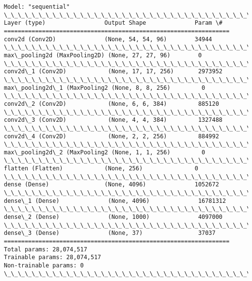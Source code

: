 \documentclass[11pt]{article}
\begin{document}
    \begin{Verbatim}[commandchars=\\\{\}]
Model: "sequential"
\_\_\_\_\_\_\_\_\_\_\_\_\_\_\_\_\_\_\_\_\_\_\_\_\_\_\_\_\_\_\_\_\_\_\_\_\_\_\_\_\_\_\_\_\_\_\_\_\_\_\_\_\_\_\_\_\_\_\_\_\_\_\_\_\_
Layer (type)                 Output Shape              Param \#
=================================================================
conv2d (Conv2D)              (None, 54, 54, 96)        34944
\_\_\_\_\_\_\_\_\_\_\_\_\_\_\_\_\_\_\_\_\_\_\_\_\_\_\_\_\_\_\_\_\_\_\_\_\_\_\_\_\_\_\_\_\_\_\_\_\_\_\_\_\_\_\_\_\_\_\_\_\_\_\_\_\_
max\_pooling2d (MaxPooling2D) (None, 27, 27, 96)        0
\_\_\_\_\_\_\_\_\_\_\_\_\_\_\_\_\_\_\_\_\_\_\_\_\_\_\_\_\_\_\_\_\_\_\_\_\_\_\_\_\_\_\_\_\_\_\_\_\_\_\_\_\_\_\_\_\_\_\_\_\_\_\_\_\_
conv2d\_1 (Conv2D)            (None, 17, 17, 256)       2973952
\_\_\_\_\_\_\_\_\_\_\_\_\_\_\_\_\_\_\_\_\_\_\_\_\_\_\_\_\_\_\_\_\_\_\_\_\_\_\_\_\_\_\_\_\_\_\_\_\_\_\_\_\_\_\_\_\_\_\_\_\_\_\_\_\_
max\_pooling2d\_1 (MaxPooling2 (None, 8, 8, 256)         0
\_\_\_\_\_\_\_\_\_\_\_\_\_\_\_\_\_\_\_\_\_\_\_\_\_\_\_\_\_\_\_\_\_\_\_\_\_\_\_\_\_\_\_\_\_\_\_\_\_\_\_\_\_\_\_\_\_\_\_\_\_\_\_\_\_
conv2d\_2 (Conv2D)            (None, 6, 6, 384)         885120
\_\_\_\_\_\_\_\_\_\_\_\_\_\_\_\_\_\_\_\_\_\_\_\_\_\_\_\_\_\_\_\_\_\_\_\_\_\_\_\_\_\_\_\_\_\_\_\_\_\_\_\_\_\_\_\_\_\_\_\_\_\_\_\_\_
conv2d\_3 (Conv2D)            (None, 4, 4, 384)         1327488
\_\_\_\_\_\_\_\_\_\_\_\_\_\_\_\_\_\_\_\_\_\_\_\_\_\_\_\_\_\_\_\_\_\_\_\_\_\_\_\_\_\_\_\_\_\_\_\_\_\_\_\_\_\_\_\_\_\_\_\_\_\_\_\_\_
conv2d\_4 (Conv2D)            (None, 2, 2, 256)         884992
\_\_\_\_\_\_\_\_\_\_\_\_\_\_\_\_\_\_\_\_\_\_\_\_\_\_\_\_\_\_\_\_\_\_\_\_\_\_\_\_\_\_\_\_\_\_\_\_\_\_\_\_\_\_\_\_\_\_\_\_\_\_\_\_\_
max\_pooling2d\_2 (MaxPooling2 (None, 1, 1, 256)         0
\_\_\_\_\_\_\_\_\_\_\_\_\_\_\_\_\_\_\_\_\_\_\_\_\_\_\_\_\_\_\_\_\_\_\_\_\_\_\_\_\_\_\_\_\_\_\_\_\_\_\_\_\_\_\_\_\_\_\_\_\_\_\_\_\_
flatten (Flatten)            (None, 256)               0
\_\_\_\_\_\_\_\_\_\_\_\_\_\_\_\_\_\_\_\_\_\_\_\_\_\_\_\_\_\_\_\_\_\_\_\_\_\_\_\_\_\_\_\_\_\_\_\_\_\_\_\_\_\_\_\_\_\_\_\_\_\_\_\_\_
dense (Dense)                (None, 4096)              1052672
\_\_\_\_\_\_\_\_\_\_\_\_\_\_\_\_\_\_\_\_\_\_\_\_\_\_\_\_\_\_\_\_\_\_\_\_\_\_\_\_\_\_\_\_\_\_\_\_\_\_\_\_\_\_\_\_\_\_\_\_\_\_\_\_\_
dense\_1 (Dense)              (None, 4096)              16781312
\_\_\_\_\_\_\_\_\_\_\_\_\_\_\_\_\_\_\_\_\_\_\_\_\_\_\_\_\_\_\_\_\_\_\_\_\_\_\_\_\_\_\_\_\_\_\_\_\_\_\_\_\_\_\_\_\_\_\_\_\_\_\_\_\_
dense\_2 (Dense)              (None, 1000)              4097000
\_\_\_\_\_\_\_\_\_\_\_\_\_\_\_\_\_\_\_\_\_\_\_\_\_\_\_\_\_\_\_\_\_\_\_\_\_\_\_\_\_\_\_\_\_\_\_\_\_\_\_\_\_\_\_\_\_\_\_\_\_\_\_\_\_
dense\_3 (Dense)              (None, 37)                37037
=================================================================
Total params: 28,074,517
Trainable params: 28,074,517
Non-trainable params: 0
\_\_\_\_\_\_\_\_\_\_\_\_\_\_\_\_\_\_\_\_\_\_\_\_\_\_\_\_\_\_\_\_\_\_\_\_\_\_\_\_\_\_\_\_\_\_\_\_\_\_\_\_\_\_\_\_\_\_\_\_\_\_\_\_\_
    \end{Verbatim}
\end{document}

